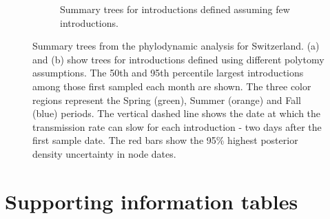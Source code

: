 \documentclass[9pt,twoside,lineno]{pnas-new}
\begin{document}
\begin{landscape}
\begin{figure}[h!]
\begin{subfigure}[b]{0.65\textwidth}
\caption{Summary trees for introductions defined assuming few introductions.}
\end{subfigure}
\caption{Summary trees from the phylodynamic analysis for Switzerland. (a) and (b) show trees for introductions defined using different polytomy assumptions. The 50th and 95th percentile largest introductions among those first sampled each month are shown. The three color regions represent the Spring (green), Summer (orange) and Fall (blue) periods. The vertical dashed line shows the date at which the transmission rate can slow for each introduction - two days after the first sample date. The red bars show the 95\% highest posterior density uncertainty in node dates.}  
\label{fig:logged-chains}
\end{figure}
\end{landscape}
\newpage

\section{Supporting information tables}
\end{document}

